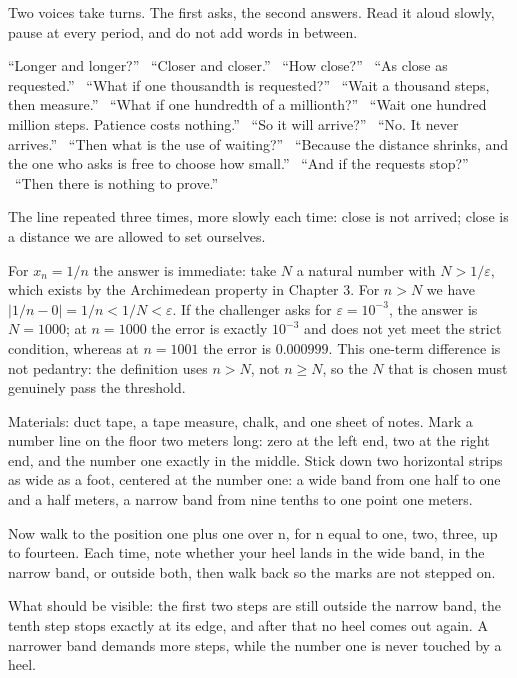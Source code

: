 \begin{bacakeras}
Two voices take turns. The first asks, the second answers. Read it aloud slowly,
pause at every period, and do not add words in between.

``Longer and longer?'' \ ``Closer and closer.'' \ ``How close?'' \ ``As close as
requested.'' \ ``What if one thousandth is requested?'' \ ``Wait a thousand steps,
then measure.'' \ ``What if one hundredth of a millionth?'' \ ``Wait one hundred
million steps. Patience costs nothing.'' \ ``So it will arrive?'' \ ``No. It never
arrives.'' \ ``Then what is the use of waiting?'' \ ``Because the distance shrinks,
and the one who asks is free to choose how small.'' \ ``And if the requests stop?''
\ ``Then there is nothing to prove.''

The line repeated three times, more slowly each time: close is not arrived; close
is a distance we are allowed to set ourselves.
\end{bacakeras}

For $x_n=1/n$ the answer is immediate: take $N$ a natural number with
$N>1/\varepsilon$, which exists by the Archimedean property in Chapter 3. For $n>N$
we have $|1/n-0|=1/n<1/N<\varepsilon$. If the challenger asks for
$\varepsilon=10^{-3}$, the answer is $N=1000$; at $n=1000$ the error is exactly
$10^{-3}$ and does not yet meet the strict condition, whereas at $n=1001$ the error
is $0.000999$. This one-term difference is not pedantry: the definition uses $n>N$,
not $n \ge N$, so the $N$ that is chosen must genuinely pass the threshold.

\begin{tangan}
Materials: duct tape, a tape measure, chalk, and one sheet of notes. Mark a number
line on the floor two meters long: zero at the left end, two at the right end, and
the number one exactly in the middle. Stick down two horizontal strips as wide as a
foot, centered at the number one: a wide band from one half to one and a half
meters, a narrow band from nine tenths to one point one meters.

Now walk to the position one plus one over n, for n equal to one, two, three, up to
fourteen. Each time, note whether your heel lands in the wide band, in the narrow
band, or outside both, then walk back so the marks are not stepped on.

What should be visible: the first two steps are still outside the narrow band, the
tenth step stops exactly at its edge, and after that no heel comes out again. A
narrower band demands more steps, while the number one is never touched by a heel.
\end{tangan}

